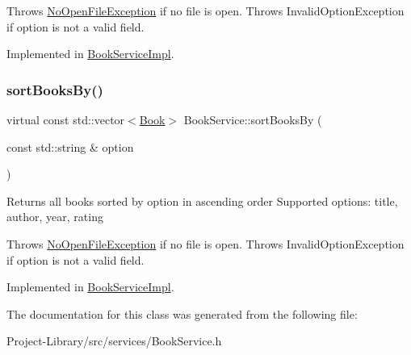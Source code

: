Throws \hyperlink{structNoOpenFileException}{No\+Open\+File\+Exception} if no file is open. Throws Invalid\+Option\+Exception if option is not a valid field. 

Implemented in \hyperlink{classBookServiceImpl_a597b769829c06f73168e08b900571cc5}{Book\+Service\+Impl}.

\mbox{\label{classBookService_a36b487f2828791a9956a491f5147471d}} 
\subsubsection{\texorpdfstring{sort\+Books\+By()}{sortBooksBy()}\hspace{0.1cm}{\footnotesize\ttfamily [2/2]}}
{\footnotesize\ttfamily virtual const std\+::vector$<$\hyperlink{classBook}{Book}$>$ Book\+Service\+::sort\+Books\+By (\begin{DoxyParamCaption}\item[{const std\+::string \&}]{option }\end{DoxyParamCaption})\hspace{0.3cm}{\ttfamily [pure virtual]}}

Returns all books sorted by option in ascending order Supported options\+: title, author, year, rating

Throws \hyperlink{structNoOpenFileException}{No\+Open\+File\+Exception} if no file is open. Throws Invalid\+Option\+Exception if option is not a valid field. 

Implemented in \hyperlink{classBookServiceImpl_a95290c709cbb9fa56e3e2ca2753096d8}{Book\+Service\+Impl}.



The documentation for this class was generated from the following file\+:\begin{DoxyCompactItemize}
\item 
Project-\/\+Library/src/services/Book\+Service.\+h\end{DoxyCompactItemize}
